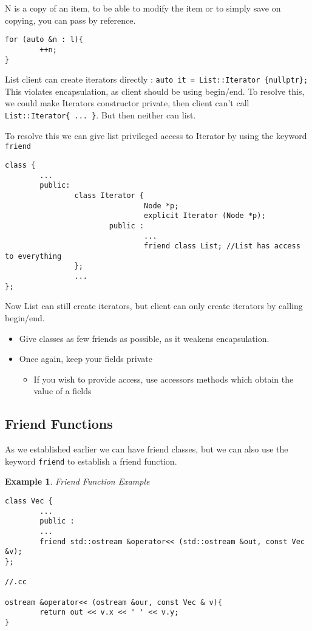\documentclass{article}
\newtheorem{ex}[theorem]{Example}
\newenvironment{cblock}[1]{%
    \tcolorbox[beamer,%
    noparskip,breakable,
    colback=lightblue,colframe=darkblue,%
    colbacklower=darkblue!75!lightblue,%
    title=#1]}%
    {\endtcolorbox}
\begin{document}
N is a copy of an item, to be able to modify the item or to simply save on copying, you can pass by reference.
\begin{lstlisting}
for (auto &n : l){
		++n;
}
\end{lstlisting}

List client can create iterators directly : \verb|auto it = List::Iterator {nullptr};| \\
This violates encapsulation, as client should be using begin/end. To resolve this, we could make Iterators constructor private, then client can't call \verb|List::Iterator{ ... }|. But then neither can list. 

To resolve this we can give list privileged access to Iterator by using the keyword \verb|friend|
\begin{lstlisting}
class {
		...
		public: 
				class Iterator {
								Node *p;
								explicit Iterator (Node *p);
						public :
								...
								friend class List; //List has access to everything
				};
				...
};						
\end{lstlisting}

Now List can still create iterators, but client can only create iterators by calling begin/end. 

\begin{cblock} {Some Useful Advice}
\begin{itemize}
\item Give classes as few friends as possible, as it weakens encapsulation. 
\item Once again, keep your fields private 
\begin{itemize}
\item If you wish to provide access, use accessors methods which obtain the value of a fields
\end{itemize}
\end{itemize}
\end{cblock}


\subsection{Friend Functions}
As we established earlier we can have friend classes, but we can also use the keyword \verb|friend| to establish a friend function.

\begin{ex} Friend Function Example 
\begin{lstlisting}
class Vec {
		...
		public :
		...
		friend std::ostream &operator<< (std::ostream &out, const Vec &v);
};

//.cc

ostream &operator<< (ostream &our, const Vec & v){
		return out << v.x << ' ' << v.y;
}
\end{lstlisting}
\end{ex}
\end{document}
